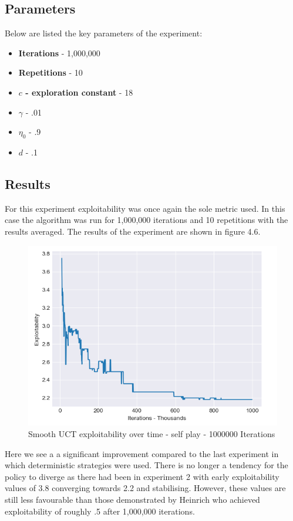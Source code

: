 \subsection{Parameters}\label{subsec:algAndCoding3}
Below are listed the key parameters of the experiment:
\begin{itemize}
    \item \textbf{Iterations} - 1,000,000
    \item \textbf{Repetitions} - 10
    \item \textbf{$c$ - exploration constant} - 18
    \item \textbf{$\gamma$} - .01
    \item \textbf{$\eta_0$} - .9
    \item \textbf{$d$} - .1
\end{itemize}
\subsection{Results}\label{subsec:results3}
For this experiment exploitability was once again the sole metric used.
In this case the algorithm was run for 1,000,000 iterations and 10 repetitions with the results averaged.
The results of the experiment are shown in figure 4.6.
\begin{figure}[!ht]
    \includegraphics[scale=.7]{images/exploitability_self-play_stochastic_1000000.png}
    \caption{Smooth UCT exploitability over time - self play - 1000000 Iterations}
\end{figure}

Here we see a a significant improvement compared to the last experiment in which deterministic strategies were used.
There is no longer a tendency for the policy to diverge as there had been in experiment 2 with
early exploitability values of 3.8 converging towards 2.2 and stabilising.
However, these values are still less favourable than those demonstrated by Heinrich who achieved
exploitability of roughly .5 after 1,000,000 iterations.

